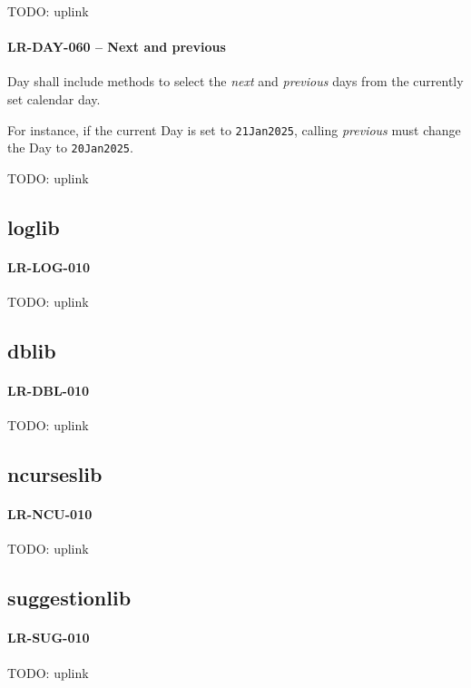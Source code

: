 TODO: uplink

\paragraph{LR-DAY-060 -- Next and previous}
Day shall include methods to select the \emph{next} and \emph{previous} days
from the currently set calendar day.

For instance, if the current Day is set to \lstinline{21Jan2025}, calling
\emph{previous} must change the Day to \lstinline{20Jan2025}.

TODO: uplink

\subsection{log\textunderscore lib}
\paragraph{LR-LOG-010}
TODO: uplink

\subsection{db\textunderscore lib}
\paragraph{LR-DBL-010}
TODO: uplink

\subsection{ncurses\textunderscore lib}
\paragraph{LR-NCU-010}
TODO: uplink

\subsection{suggestion\textunderscore lib}
\paragraph{LR-SUG-010}
TODO: uplink
